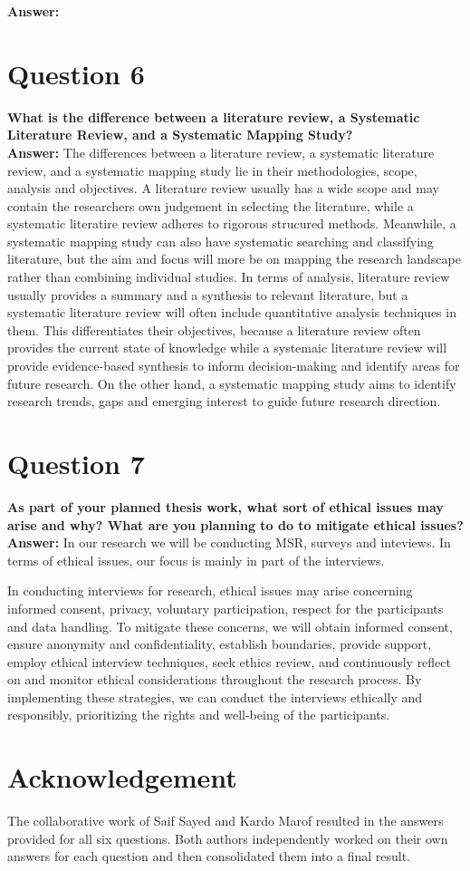 \documentclass[conference]{IEEEtran}
\begin{document}
\textbf{Answer:}

\section{Question 6}

\textbf{What is the difference between a literature review, a Systematic Literature Review, and a Systematic Mapping Study?}\\

\textbf{Answer:}
The differences between a literature review, a systematic literature review, and a systematic mapping study lie in their methodologies, scope, analysis and objectives. A literature review usually has a wide scope and may contain the researchers own judgement in selecting the literature, while a systematic literatire review adheres to rigorous strucured methods. Meanwhile, a systematic mapping study can also have systematic searching and classifying literature, but the aim and focus will more be on mapping the research landscape rather than combining individual studies.
In terms of analysis, literature review usually provides a summary and a synthesis to relevant literature, but a systematic literature review will often include quantitative analysis techniques in them. This differentiates their objectives, because a literature review often provides the current state of knowledge while a systemaic literature review will provide evidence-based synthesis to inform decision-making and identify areas for future research. On the other hand, a systematic mapping study aims to identify research trends, gaps and emerging interest to guide future research direction. 



\section{Question 7}

\textbf{As part of your planned thesis work, what sort of ethical issues may arise and why? What are you planning to do to mitigate ethical issues?}\\

\textbf{Answer:} 
In our research we will be conducting MSR, surveys and inteviews. In terms of ethical issues, our focus is mainly in part of the interviews.

In conducting interviews for research, ethical issues may arise concerning informed consent, privacy, voluntary participation, respect for the participants and data handling. To mitigate these concerns, we will obtain informed consent, ensure anonymity and confidentiality, establish boundaries, provide support, employ ethical interview techniques, seek ethics review, and continuously reflect on and monitor ethical considerations throughout the research process. By implementing these strategies, we can conduct the interviews ethically and responsibly, prioritizing the rights and well-being of the participants.



\section{Acknowledgement}
The collaborative work of Saif Sayed and Kardo Marof resulted in the answers provided for all six questions. Both authors independently worked on their own answers for each question and then consolidated them into a final result.
\end{document}
